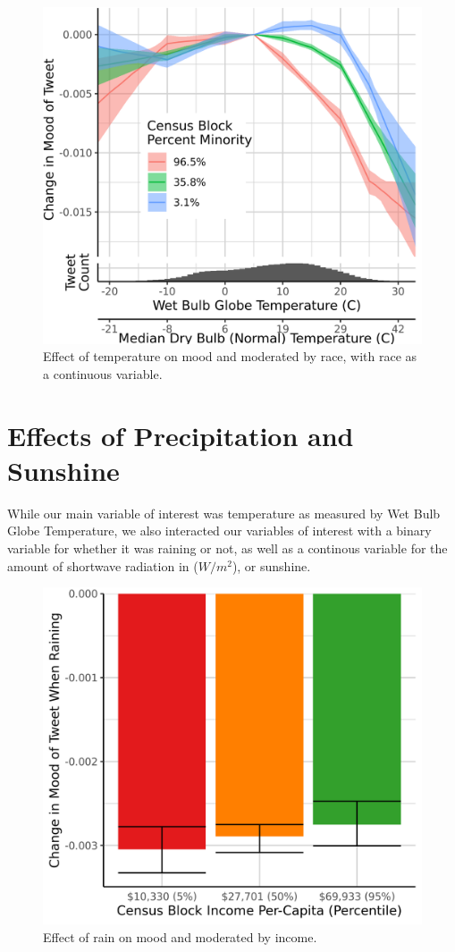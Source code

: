 \documentclass{article}
\begin{document}
\begin{figure}[H]
  \centering
  \includegraphics[width=0.6\linewidth]{../res/wbgt-race.png}
  \caption{Effect of temperature on mood and moderated by race, with race as a continuous variable.}
\end{figure}

\section{Effects of Precipitation and Sunshine}
While our main variable of interest was temperature as measured by Wet Bulb Globe Temperature, we also interacted our variables of interest with a binary variable for whether it was raining or not, as well as a continous variable for the amount of shortwave radiation in ($W/m^2$), or sunshine.

\begin{figure}[H]
  \centering
  \includegraphics[width=0.6\linewidth]{../res/raining-income.png}
  \caption{Effect of rain on mood and moderated by income.}
  \label{fig:timeseries}
\end{figure}
\end{document}
